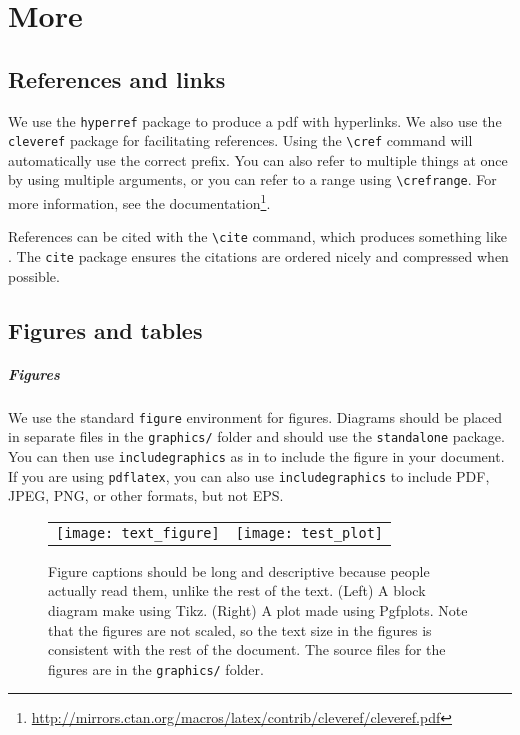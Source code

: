 \chapter{More}

\section{References and links}
\label{sec:references}

We use the \verb|hyperref| package to produce a pdf with hyperlinks. We also use the \verb|cleveref| package for facilitating references. Using the \verb|\cref| command will automatically use the correct prefix. You can also refer to multiple things at once by using multiple arguments, or you can refer to a range using \verb|\crefrange|. For more information, see the documentation\footnote{\url{http://mirrors.ctan.org/macros/latex/contrib/cleveref/cleveref.pdf}}.

References can be cited with the \verb|\cite| command, which produces something like \cite{lessard16,lessard2015optimal,sundararajan2020analysis,tmm}. The \verb|cite| package ensures the citations are ordered nicely and compressed when possible.


\section{Figures and tables}

\paragraph{Figures}

We use the standard \verb|figure| environment for figures. Diagrams should be placed in separate files in the \texttt{graphics/} folder and should use the \texttt{standalone} package. You can then use \verb|includegraphics| as in  to include the figure in your document. If you are using \verb|pdflatex|, you can also use \verb|includegraphics| to include PDF, JPEG, PNG, or other formats, but not EPS.

\begin{figure}[htb]
	\centering
	\begin{tabular}{cc}
		\texttt{[image: text\_figure]} & \texttt{[image: test\_plot]}
	\end{tabular}
	\caption{Figure captions should be long and descriptive because people actually read them, unlike the rest of the text. (Left) A block diagram make using Tikz. (Right) A plot made using Pgfplots. Note that the figures are not scaled, so the text size in the figures is consistent with the rest of the document. The source files for the figures are in the \texttt{graphics/} folder.}
  \label{fig:sample}
\end{figure}

